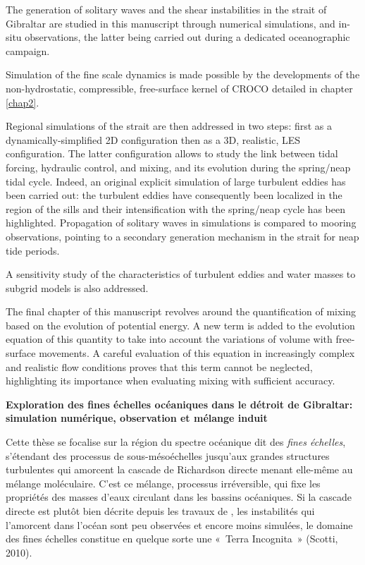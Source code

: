\documentclass[a4paper,12pt,notitlepage,twoside]{report}
\numberwithin{equation}{section}
\begin{document}
The generation of solitary waves and the shear instabilities in the strait of Gibraltar are studied in this manuscript through numerical simulations, and in-situ observations, the latter being carried out during a dedicated oceanographic campaign.

Simulation of the fine scale dynamics is made possible by the developments of the non-hydrostatic, compressible, free-surface kernel of CROCO detailed in chapter \ref{chap2}.

Regional simulations of the strait are then addressed in two steps: first as a dynamically-simplified 2D configuration then as a 3D, realistic, LES configuration. The latter configuration allows to study the link between tidal forcing, hydraulic control, and mixing, and its evolution during the spring/neap tidal cycle. Indeed, an original explicit simulation of large turbulent eddies has been carried out: the turbulent eddies have consequently been localized in the region of the sills and their intensification with the spring/neap cycle has been highlighted. Propagation of solitary waves in simulations is compared to mooring observations, pointing to a secondary generation mechanism in the strait for neap tide periods.

A sensitivity study of the characteristics of turbulent eddies and water masses to subgrid models is also addressed.

The final chapter of this manuscript revolves around the quantification of mixing based on the evolution of potential energy. A new term is added to the evolution equation of this quantity to take into account the variations of volume with free-surface movements. A careful evaluation of this equation in increasingly complex and realistic flow conditions proves that this term cannot be neglected, highlighting its importance when evaluating mixing with sufficient accuracy.


\newpage
\thispagestyle{empty}
\begin{center}
   \textbf{Exploration des fines échelles océaniques dans le détroit de Gibraltar: simulation numérique, observation et mélange induit} 
\end{center}
Cette thèse se focalise sur la région du spectre océanique dit des \textit{fines échelles}, s'étendant des processus de sous-mésoéchelles jusqu'aux grandes structures turbulentes qui amorcent la cascade de Richardson directe menant elle-même au mélange moléculaire. C’est ce mélange, processus irréversible, qui fixe les propriétés des masses d’eaux circulant dans les bassins océaniques. Si la cascade directe est plutôt bien décrite depuis les travaux de \cite{kolmogorov_local_1941}, les instabilités qui l'amorcent dans l’océan sont peu observées et encore moins simulées, le domaine des fines échelles constitue en quelque sorte une « Terra Incognita » (Scotti, 2010).
\end{document}
